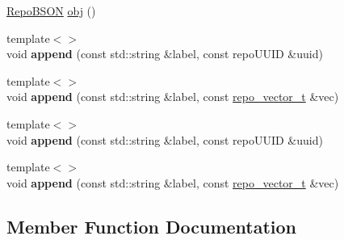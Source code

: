 \begin{DoxyCompactItemize}
\item 
\hyperlink{classrepo_1_1core_1_1model_1_1_repo_b_s_o_n}{Repo\+B\+S\+O\+N} \hyperlink{classrepo_1_1core_1_1model_1_1_repo_b_s_o_n_builder_a8760ee2f38f05dbcc85ef2a6bb4cabfa}{obj} ()
\item 
\hypertarget{classrepo_1_1core_1_1model_1_1_repo_b_s_o_n_builder_ae0bb5dd33eb1342e27fc3b7dc201685f}{}{\footnotesize template$<$$>$ }\\void {\bfseries append} (const std\+::string \&label, const repo\+U\+U\+I\+D \&uuid)\label{classrepo_1_1core_1_1model_1_1_repo_b_s_o_n_builder_ae0bb5dd33eb1342e27fc3b7dc201685f}

\item 
\hypertarget{classrepo_1_1core_1_1model_1_1_repo_b_s_o_n_builder_ac4380c7a90c696c6e92b2c03123ff327}{}{\footnotesize template$<$$>$ }\\void {\bfseries append} (const std\+::string \&label, const \hyperlink{structrepo__vector__t}{repo\+\_\+vector\+\_\+t} \&vec)\label{classrepo_1_1core_1_1model_1_1_repo_b_s_o_n_builder_ac4380c7a90c696c6e92b2c03123ff327}

\item 
\hypertarget{classrepo_1_1core_1_1model_1_1_repo_b_s_o_n_builder_ae0bb5dd33eb1342e27fc3b7dc201685f}{}{\footnotesize template$<$$>$ }\\void {\bfseries append} (const std\+::string \&label, const repo\+U\+U\+I\+D \&uuid)\label{classrepo_1_1core_1_1model_1_1_repo_b_s_o_n_builder_ae0bb5dd33eb1342e27fc3b7dc201685f}

\item 
\hypertarget{classrepo_1_1core_1_1model_1_1_repo_b_s_o_n_builder_ac4380c7a90c696c6e92b2c03123ff327}{}{\footnotesize template$<$$>$ }\\void {\bfseries append} (const std\+::string \&label, const \hyperlink{structrepo__vector__t}{repo\+\_\+vector\+\_\+t} \&vec)\label{classrepo_1_1core_1_1model_1_1_repo_b_s_o_n_builder_ac4380c7a90c696c6e92b2c03123ff327}

\end{DoxyCompactItemize}


\subsection{Member Function Documentation}
\hypertarget{classrepo_1_1core_1_1model_1_1_repo_b_s_o_n_builder_aac9e1ec05f85927b326da215e5505d94}{}
